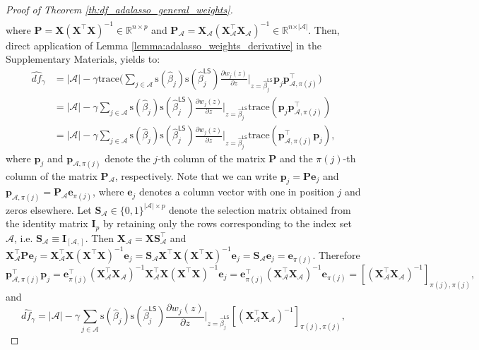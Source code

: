 \documentclass[a4paper, 12pt]{article}
\newcommand{\Aset}{\mathcal{A}}
\newcommand{\sgn}{\mathrm{s}}
\newcommand{\trace}{\mathrm{trace}}
\newcommand{\T}{\top}
\def\be{\boldsymbol{e}}
\def\bp{\boldsymbol{p}}
\def\bI{\mathbf{I}}
\def\bP{\mathbf{P}}
\def\bS{\mathbf{S}}
\def\bX{\mathbf{X}}
\def\be{\mathbf{e}}
\def\bp{\mathbf{p}}
\begin{document}
\begin{appendix}
\begin{proof}[Proof of Theorem \ref{th:df_adalasso_general_weights}]
\begin{equation*}
\begin{aligned}
\end{aligned}
\end{equation*}
where $\bP=\bX(\bX^{\T}\bX)^{-1}\in\mathbb{R}^{n\times p}$ and $\bP_{\Aset}=\bX_{\Aset}(\bX_{\Aset}^{\T}\bX_{\Aset})^{-1}\in\mathbb{R}^{n\times \vert\Aset\vert}$. Then, direct application of Lemma \ref{lemma:adalasso_weights_derivative} in the Supplementary Materials, yields to:
\begin{equation*}
\begin{aligned}
\widehat{df}_\gamma &= |\Aset|-\gamma \trace \bigg( \sum_{j \in \Aset} \sgn(\widehat{\beta}_j) \sgn(\widehat{\beta}_j^\mathsf{LS}) \frac{\partial w_j(z)}{\partial z} \bigg|_{z = \widehat{\beta}_j^\mathsf{LS}} \bp_{j} \bp_{\Aset,\pi(j)}^{\T} \bigg) \\
&= |\Aset|-\gamma \sum_{j \in \Aset} \sgn(\widehat{\beta}_j) \sgn(\widehat{\beta}_j^\mathsf{LS}) \frac{\partial w_j(z)}{\partial z} \bigg|_{z = \widehat{\beta}_j^\mathsf{LS}} 
\trace ( \bp_{j} \bp_{\Aset,\pi(j)}^{\T})\\
&= |\Aset|-\gamma \sum_{j \in \Aset} \sgn(\widehat{\beta}_j) \sgn(\widehat{\beta}_j^\mathsf{LS}) \frac{\partial w_j(z)}{\partial z} \bigg|_{z = \widehat{\beta}_j^\mathsf{LS}} 
\trace( \bp_{\Aset,\pi(j)}^{\T} \bp_{j}),
\end{aligned}
\end{equation*}
where $\bp_{j}$ and $\bp_{\Aset,\pi(j)}$ denote the $j$-th column of the matrix $\bP$ and the $\pi(j)$-th column of the matrix $\bP_\Aset$, respectively. Note that we can write $\bp_j = \bP \be_{j}$ and $\bp_{\Aset,\pi(j)} = \bP_{\Aset} \be_{\pi(j)}$, where $\be_j$ denotes a column vector with one in position $j$ and zeros elsewhere. Let $\bS_{\Aset}\in\{0,1\}^{\vert\Aset\vert\times p}$ denote the selection matrix obtained from the identity matrix $\bI_p$ by retaining only the rows corresponding to the index set $\Aset$, i.e. $\bS_{\Aset}\equiv\bI_{[\Aset,]}$. Then $\bX_{\Aset}=\bX \bS_{\Aset}^{\T}$ and
$\bX_\Aset^{\T}\bP\be_{j}=\bX_\Aset^{\T}\bX(\bX^{\T}\bX)^{-1}\be_{j}=\bS_\Aset\bX^{\T}\bX(\bX^{\T}\bX)^{-1}\be_{j}=\bS_\Aset\be_{j}=\be_{\pi(j)}$. Therefore 
\begin{equation*}
\bp_{\Aset, \pi(j)}^{\T} \bp_{j} = \be_{\pi(j)}^{\T} (\bX_{\Aset}^{\T}\bX_{\Aset})^{-1}\bX_{\Aset}^{\T} \bX(\bX^{\T}\bX)^{-1} \be_{j} = \be_{ \pi(j)}^{\T} (\bX_{\Aset}^{\T}\bX_{\Aset})^{-1} \be_{\pi(j)} = [(\bX_{\Aset}^{\T}\bX_{\Aset})^{-1}]_{\pi(j),\pi(j)},
\end{equation*}
and
\begin{equation*}
\widehat{df}_\gamma =|\Aset|-\gamma \sum_{j \in \Aset} \sgn(\widehat{\beta}_j) \sgn(\widehat{\beta}_j^\mathsf{LS}) \frac{\partial w_j(z)}{\partial z} \bigg|_{z = \widehat{\beta}_j^\mathsf{LS}} [(\bX_{\Aset}^{\T} \bX_{\Aset} )^{-1}]_{\pi(j),\pi(j)},

\end{equation*}
\end{proof}
\end{appendix}
\end{document}
